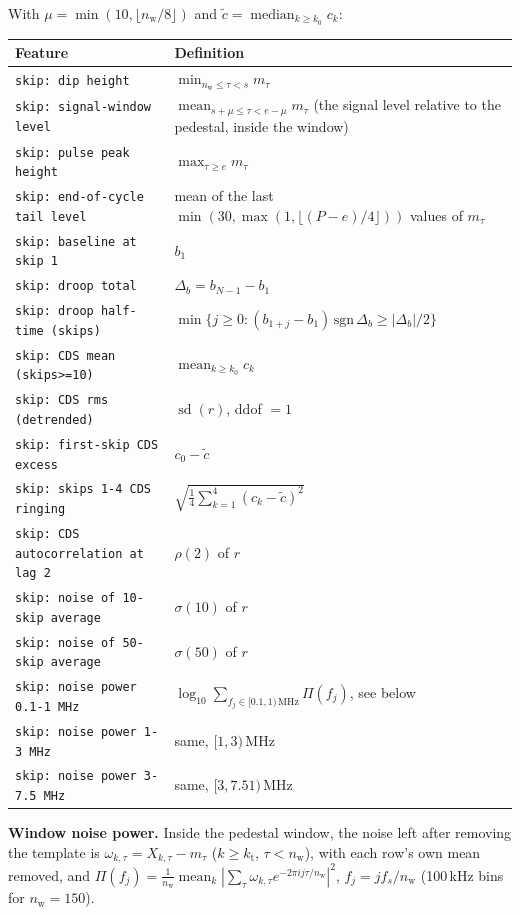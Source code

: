 \documentclass[10pt]{article}
\newcommand{\code}[1]{\texttt{#1}}
\newcommand{\med}{\operatorname*{median}}
\newcommand{\mean}{\operatorname*{mean}}
\newcommand{\std}{\operatorname{sd}}
\newcommand{\nw}{n_\text{w}}
\newcommand{\kt}{k_\text{t}}
\newcommand{\ko}{k_0}
\begin{document}
With $\mu = \min(10, \lfloor\nw/8\rfloor)$ and $\tilde c = \med_{k \ge \ko} c_k$:
\begin{center}
\small
\renewcommand{\arraystretch}{1.25}
\begin{longtable}{>{\raggedright\arraybackslash}p{}>{\raggedright\arraybackslash}p{}}
\toprule
Feature & Definition \\
\midrule
\endhead
\code{skip: dip height} & $\min_{\nw \le \tau < s} m_\tau$ \\
\code{skip: signal-window level} & $\mean_{s+\mu \le \tau < e - \mu} m_\tau$ (the signal level relative to the pedestal, inside the window) \\
\code{skip: pulse peak height} & $\max_{\tau \ge e} m_\tau$ \\
\code{skip: end-of-cycle tail level} & mean of the last $\min(30, \max(1, \lfloor(P - e)/4\rfloor))$ values of $m_\tau$ \\
\code{skip: baseline at skip 1} & $b_1$ \\
\code{skip: droop total} & $\Delta_b = b_{N-1} - b_1$ \\
\code{skip: droop half-time (skips)} & $\min\{j \ge 0 : (b_{1+j} - b_1)\,\mathrm{sgn}\,\Delta_b \ge |\Delta_b|/2\}$ \\
\code{skip: CDS mean (skips>=10)} & $\mean_{k \ge \ko} c_k$ \\
\code{skip: CDS rms (detrended)} & $\std(r)$, ddof $=1$ \\
\code{skip: first-skip CDS excess} & $c_0 - \tilde c$ \\
\code{skip: skips 1-4 CDS ringing} & $\sqrt{\tfrac14 \sum_{k=1}^{4}(c_k - \tilde c)^2}$ \\
\code{skip: CDS autocorrelation at lag 2} & $\rho(2)$ of $r$ \\
\code{skip: noise of 10-skip average} & $\sigma(10)$ of $r$ \\
\code{skip: noise of 50-skip average} & $\sigma(50)$ of $r$ \\
\code{skip: noise power 0.1-1 MHz} & $\log_{10}\sum_{f_j \in [0.1, 1)\,\text{MHz}} \Pi(f_j)$, see below \\
\code{skip: noise power 1-3 MHz} & same, $[1, 3)$\,MHz \\
\code{skip: noise power 3-7.5 MHz} & same, $[3, 7.51)$\,MHz \\
\bottomrule
\end{longtable}
\end{center}
\textbf{Window noise power.} Inside the pedestal window, the noise left after removing the template is
$\omega_{k,\tau} = X_{k,\tau} - m_\tau$ ($k \ge \kt$, $\tau < \nw$), with each row's own mean removed, and
$\Pi(f_j) = \tfrac{1}{\nw}\mean_k |\sum_\tau \omega_{k,\tau} e^{-2\pi i j\tau/\nw}|^2$, $f_j = j f_s/\nw$ (100\,kHz bins for
$\nw = 150$).
\end{document}
